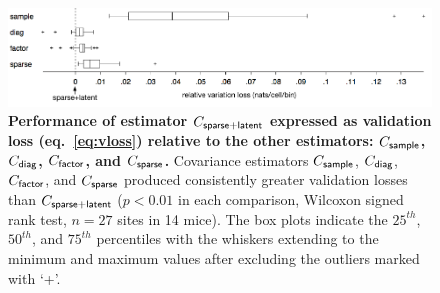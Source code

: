 \begin{figure}
\begin{fullpage}
        \begin{center}
        \includegraphics[width=\textwidth]{./figures/Figure4.pdf}
        \end{center}
\caption[Evaluation of correlation estimators by cross-validation]
{{\bf Performance of estimator $C_{\sf sparse+latent}$ expressed as validation loss (eq.~\ref{eq:vloss}) relative to the other estimators: $C_{\sf sample}$, $C_{\sf diag}$, $C_{\sf factor}$, and $C_{\sf sparse}$.}
Covariance estimators $C_{\sf sample}$, $C_{\sf diag}$, $C_{\sf factor}$, and $C_{\sf sparse}$ produced consistently greater validation losses than $C_{\sf sparse+latent}$ ($p<0.01$ in each comparison, Wilcoxon signed rank test, $n=27$ sites in 14 mice). The box plots indicate the $25^{th}$, $50^{th}$, and $75^{th}$ percentiles with the whiskers extending to the minimum and maximum values after excluding the outliers marked with `+'.
}\label{fig:4}
\end{fullpage}
\end{figure}
